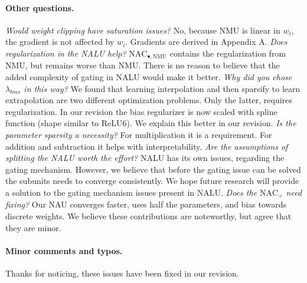 \documentclass{article}
\begin{document}
\vspace{-0.3cm} \paragraph{Other questions.} \textit{Would weight clipping have saturation issues?} No, because NMU is linear in $w_i$, the gradient is not affected by $w_i$. Gradients are derived in Appendix A. \textit{Does regularization in the NALU help?} $\mathrm{NAC}_{\bullet, \mathrm{NMU}}$ contains the regularization from NMU, but remains worse than NMU. There is no reason to believe that the added complexity of gating in NALU would make it better. \textit{Why did you chose $\lambda_{bias}$ in this way?} We found that learning interpolation and then sparsify to learn extrapolation are two different optimization problems. Only the latter, requires regularization. In our revision the bias regularizer is now scaled with spline function (shape similar to ReLU6). We explain this better in our revision. \textit{Is the parameter sparsity a necessity?} For multiplication it is a requirement. For addition and subtraction it helps with interpretability. \textit{Are the assumptions of splitting the NALU worth the effort?} NALU has its own issues, regarding the gating mechanism. However, we believe that before the gating issue can be solved the subunits needs to converge consistently. We hope future research will provide a solution to the gating mechanism issues present in NALU. \textit{Does the $\mathrm{NAC}_{+}$ need fixing?} Our NAU converges faster, uses half the parameters, and bias towards discrete weights. We believe these contributions are noteworthy, but agree that they are minor.

\vspace{-0.3cm} \paragraph{Minor comments and typos.} Thanks for noticing, these issues have been fixed in our revision.

\end{document}
